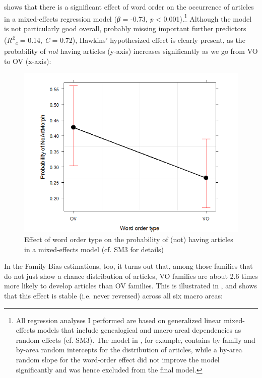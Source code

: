 \documentclass[output=paper]{langsci/langscibook}
\begin{document}
 shows that there is a significant effect of word order on the occurrence of articles in a mixed-effects regression model (\textit{β} = -0.73, \textit{p} < 0.001).\footnote{All regression analyses I performed are based on generalized linear mixed-effects models that include genealogical and macro-areal dependencies as random effects (cf. SM3). The model in , for example, contains by-family and by-area random intercepts for the distribution of articles, while a by-area random slope for the word-order effect did not improve the model significantly and was hence excluded from the final model.} Although the model is not particularly good overall, probably missing important further predictors (\textit{R\textsuperscript{2}}\textit{\textsubscript{c}} = 0.14, \textit{C} = 0.72), Hawkins’ hypothesized effect is clearly present, as the probability of \textit{not} having articles (y-axis) increases significantly as we go from VO to OV (x-axis):

  

\begin{figure}
\includegraphics[width=\textwidth]{figures/schmidtkebode-img2.png}
\caption{Effect of word order type on the probability of (not) having articles in a mixed-effects model (cf. SM3 for details)}
\label{fig:ksb:2}
\end{figure}

In the Family Bias estimations, too, it turns out that, among those families that do not just show a chance distribution of articles, VO families are about 2.6 times more likely to develop articles than OV families. This is illustrated in , and  shows that this effect is stable (i.e. never reversed) across all six macro areas:
 
\end{document}
